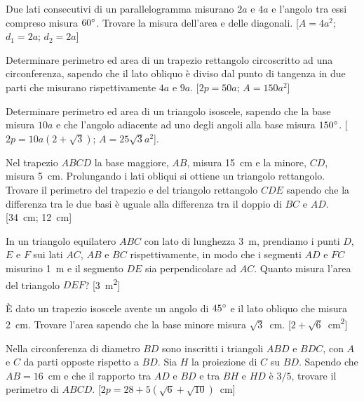 \begin{multicols}{2}
\begin{esercizio}
\label{ese:7.16}
Due lati consecutivi di un parallelogramma misurano $2a$ e $4a$ e l'angolo tra essi compreso misura $60{}^{\circ}$. Trovare la misura dell'area e delle diagonali. 	[$A=4a^2$; $d_1=2a$; $d_2=2a$]
\end{esercizio}

\begin{esercizio}
\label{ese:7.17}
Determinare perimetro ed area di un trapezio rettangolo circoscritto ad una circonferenza, sapendo che il lato obliquo è diviso dal punto di tangenza in due parti che misurano rispettivamente $4a$ e $9a$.  [$2p=50a$; $A=150a^2$]
\end{esercizio}

\begin{esercizio}
\label{ese:7.18}
Determinare perimetro ed area di un triangolo isoscele, sapendo che la base misura $10a$ e che l'angolo adiacente ad uno degli angoli alla base misura $150{}^{\circ}$. 	[$2p=10a(2+\sqrt{3})$; $A=25\sqrt{3}a^2$].
\end{esercizio}

\begin{esercizio}
\label{ese:7.19}
Nel trapezio $ABCD$ la base maggiore, $AB$, misura 15~cm e la minore, $CD$, misura 5~cm. Prolungando i lati obliqui si ottiene un triangolo rettangolo. Trovare il perimetro del trapezio e del triangolo rettangolo $CDE$ sapendo che la differenza tra le due basi è uguale alla differenza tra il doppio di $BC$ e $AD$.	 [34~cm; 12~cm]
\end{esercizio}

\begin{esercizio}
\label{ese:7.20}
In un triangolo equilatero $ABC$ con lato di lunghezza 3~m, prendiamo i punti $D$, $E$ e $F$ sui lati $AC$, $AB$ e $BC$ rispettivamente, in modo che i segmenti $AD$ e $FC$ misurino 1~m e il segmento $DE$ sia perpendicolare ad $AC$. Quanto misura l'area del triangolo $DEF$? 	[3~m\textsuperscript{2}]
\end{esercizio}

\begin{esercizio}
\label{ese:7.21}
\`E dato un trapezio isoscele avente un angolo di $45{}^{\circ}$ e il lato obliquo che misura 2~cm. Trovare l'area sapendo che la base minore misura $\sqrt{3}$~cm.  [$2+\sqrt{6}$~cm\textsuperscript{2}]
\end{esercizio}

\begin{esercizio}
\label{ese:7.22}
Nella circonferenza di diametro $BD$ sono inscritti i triangoli $ABD$ e $BDC$, con $A$ e $C$ da parti opposte rispetto a $BD$. Sia $H$ la proiezione di $C$ su $BD$. Sapendo che $AB=16$~cm e che il rapporto tra $AD$ e $BD$ e tra $BH$ e $HD$ è $3/5$, trovare il perimetro di $ABCD$. 	[$2p=28+5(\sqrt{6}+\sqrt{10})$~cm]
\end{esercizio}


\end{multicols}
